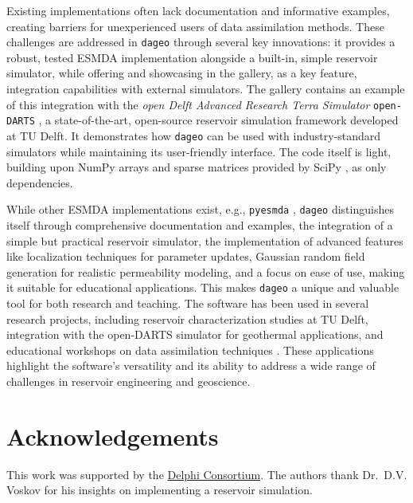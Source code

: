 \documentclass[a4paper, colorlinks=false, 11pt, parskip=half,
               notitlepage, oneside, fleqn, pdftex]{scrartcl}
\begin{document}
Existing implementations often lack documentation and informative examples,
creating barriers for unexperienced users of data assimilation methods. These
challenges are addressed in \texttt{dageo} through several key innovations: it
provides a robust, tested ESMDA implementation alongside a built-in, simple
reservoir simulator, while offering and showcasing in the gallery, as a key
feature, integration capabilities with external simulators. The gallery
contains an example of this integration with the \emph{open Delft Advanced
Research Terra Simulator} \texttt{open-DARTS} \citep{opendarts}, a
state-of-the-art, open-source reservoir simulation framework developed at TU
Delft. It demonstrates how \texttt{dageo} can be used with industry-standard
simulators while maintaining its user-friendly interface. The code itself is
light, building upon NumPy arrays \citep{NumPy} and sparse matrices provided by
SciPy \citep{SciPy}, as only dependencies.

While other ESMDA implementations exist, e.g., \texttt{pyesmda}
\citep{pyesmda}, \texttt{dageo} distinguishes itself through comprehensive
documentation and examples, the integration of a simple but practical reservoir
simulator, the implementation of advanced features like localization techniques
for parameter updates, Gaussian random field generation for realistic
permeability modeling, and a focus on ease of use, making it suitable for
educational applications. This makes \texttt{dageo} a unique and valuable tool
for both research and teaching. The software has been used in several research
projects, including reservoir characterization studies at TU Delft, integration
with the open-DARTS simulator for geothermal applications, and educational
workshops on data assimilation techniques \citep[e.g.,][]{saifullin,seabra}.
These applications highlight the software's versatility and its ability to
address a wide range of challenges in reservoir engineering and geoscience.

\section*{Acknowledgements}

This work was supported by the \href{https://www.delphi-consortium.com}{Delphi
Consortium}. The authors thank Dr.~D.V. Voskov for his insights on implementing
a reservoir simulation.
\end{document}
